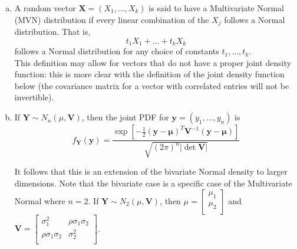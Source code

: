 \begin{enumerate}[a)]
    \item A random vector $\mathbf{X} = (X_1, \dots, X_k)$ is said to have a Multivariate Normal (MVN) distribution if every
    linear combination of the $X_j$ follows a Normal distribution. That is,
    \[
        t_1 X_1 + \dots + t_k X_k 
    \]
    follows a Normal distribution for any choice of constants $t_1, \dots, t_k$. \\

    This definition may allow for vectors that do not have a proper joint density function: this is more clear with the definition of the joint density function below (the covariance matrix for a vector with correlated entries will not be invertible).

    \item If $\mathbf{Y} \sim N_n(\mu, \mathbf{V})$, then the joint PDF for $\mathbf{y} = (y_1, \dots, y_n)$ is
    \[
        f_{\mathbf{Y}}(\mathbf{y}) = \frac{\exp \left[ -\frac{1}{2}(\mathbf{y} -\mathbf{\mu})^T \mathbf{V}^{-1} (\mathbf{y} - \mathbf{\mu}) \right]}{\sqrt{(2\pi )^n |\det \mathbf{V}|}}
    \]

    It follows that this is an extension of the bivariate Normal density to larger dimensions. Note that the bivariate case is a specific case of the Multivariate Normal where $n = 2$.
    If $\mathbf{Y} \sim N_2(\mu, \mathbf{V})$, then $\mu = \begin{bmatrix}
        \mu_1 \\
        \mu_2 \\
    \end{bmatrix}$ and $\mathbf{V} = \begin{bmatrix}
        \sigma_1^2 & \rho \sigma_1\sigma_2   \\
        \rho \sigma_1\sigma_2 & \sigma_2^2  \\
    \end{bmatrix}$. \\


\end{enumerate}
